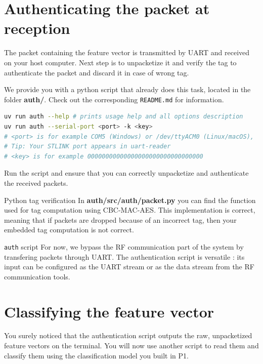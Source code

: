 \section{Authenticating the packet at reception}

The packet containing the feature vector is transmitted by UART and received on your host computer. Next step is to unpacketize it and verify the tag to authenticate the packet and discard it in case of wrong tag.

We provide you with a python script that already does this task, located in the folder \textbf{auth/}. Check out the corresponding \texttt{README.md} for information.

\begin{lstlisting}[columns=fullflexible,language=bash]
uv run auth --help # prints usage help and all options description
uv run auth --serial-port <port> -k <key>
# <port> is for example COM5 (Windows) or /dev/ttyACM0 (Linux/macOS),
# Tip: Your STLINK port appears in uart-reader
# <key> is for example 00000000000000000000000000000000
\end{lstlisting}

Run the script and ensure that you can correctly unpacketize and authenticate the received packets.

\begin{bclogo}[couleur = gray!20, arrondi = 0.2, logo=\bcinfo]{Python tag verification}
In \textbf{auth/src/auth/packet.py} you can find the function used for tag computation using CBC-MAC-AES. This implementation is correct, meaning that if packets are dropped because of an incorrect tag, then your embedded tag computation is not correct.
\end{bclogo}

\begin{bclogo}[couleur = gray!20, arrondi = 0.2, logo=\bcinfo]{\texttt{auth} script}
For now, we bypass the RF communication part of the system by transfering packets through UART. The authentication script is versatile : its input can be configured as the UART stream or as the data stream from the RF communication tools.
\end{bclogo}

\section{Classifying the feature vector}

You surely noticed that the authentication script outputs the raw, unpacketized feature vectors on the terminal. You will now use another script to read them and classify them using the classification model you built in P1.

